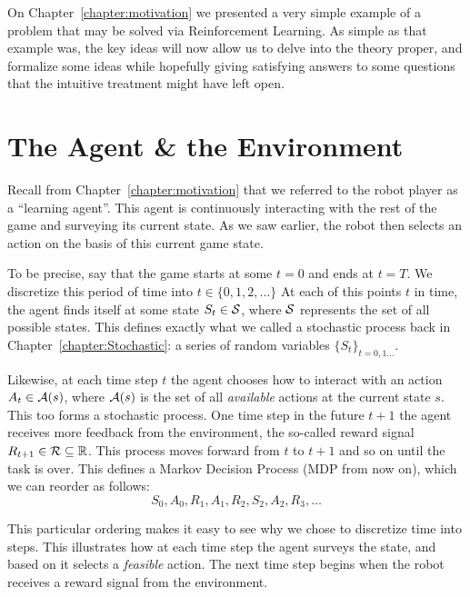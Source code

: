 
\label{chapter:ReinforcementLearning}

On Chapter~\ref{chapter:motivation} we presented a very simple 
example of a problem that may be solved via Reinforcement 
Learning. As simple as that example was, the key ideas will now 
allow us to delve into the theory proper, and formalize some 
ideas while hopefully giving satisfying answers to some 
questions that the intuitive treatment might have left open.

\section{The Agent \& the Environment}
Recall from Chapter~\ref{chapter:motivation} that we referred 
to the robot player as a ``learning agent''. This agent is 
continuously interacting with the rest of the game and 
surveying its current state. As we saw earlier, the robot then 
selects an action on the basis of this current game state.

To be precise, say that the game starts at some $t=0$ and ends 
at $t=T$. We discretize this period of time into $t \in \{0, 1, 
2, \ldots \}$ At each of this points $t$ in time, the agent 
finds itself at some state $S_t \in \mathcal{S}$, where $\mathcal{S}$ 
represents the set of all possible states. This defines exactly 
what we called a stochastic process back in 
Chapter~\ref{chapter:Stochastic}: a series of random variables 
$\{ S_t \}_{t = 0, 1 \ldots}$. 

Likewise, at each time step $t$ the agent chooses how to 
interact with an action $A_t \in \mathcal{A}(s)$, where 
$\mathcal{A}(s)$ is the set of all \textit{available} actions at 
the current state $s$. This too forms a stochastic process. One 
time step in the future $t+1$ the agent receives more feedback 
from the environment, the so-called reward signal $R_{t+1} \in 
\mathcal{R} \subseteq \mathbb{R}$. This process moves forward from $t$ to 
$t+1$ and so on until the task is over. This defines a Markov 
Decision Process (MDP from now on), which we can reorder as 
follows:
\begin{equation}
	S_0, A_0, R_1, A_1, R_2, S_2, A_2, R_3, \ldots
\end{equation}

This particular ordering makes it easy to see why we chose to 
discretize time into steps. This illustrates how at each time 
step the agent surveys the state, and based on it selects a 
\textit{feasible} action. The next time step begins when the 
robot receives a reward signal from the environment. 

